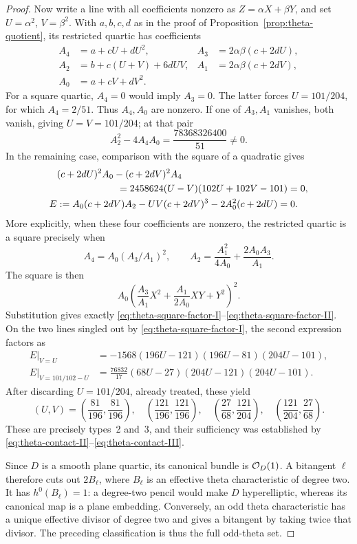 \begin{proof}
Now write a line with all coefficients nonzero as $Z=\alpha X+\beta Y$,
and set $U=\alpha^2$, $V=\beta^2$.  With $a,b,c,d$ as in the proof of
Proposition~\ref{prop:theta-quotient}, its restricted quartic has
coefficients
\begin{align*}
 A_4&=a+cU+dU^2,&
 A_3&=2\alpha\beta(c+2dU),\\
 A_2&=b+c(U+V)+6dUV,&
 A_1&=2\alpha\beta(c+2dV),\\
 A_0&=a+cV+dV^2.
\end{align*}
For a square quartic, $A_4=0$ would imply $A_3=0$.  The latter forces
$U=101/204$, for which $A_4=2/51$.  Thus $A_4,A_0$ are nonzero.
If one of $A_3,A_1$ vanishes, both vanish, giving $U=V=101/204$; at that
pair
\[
 A_2^2-4A_4A_0=\frac{78368326400}{51}\ne0.
\]
In the remaining case, comparison with the square of a quadratic gives
\begin{align}
 &(c+2dU)^2A_0-(c+2dV)^2A_4\notag\\
 &\hspace{22mm}=2458624(U-V)(102U+102V-101)=0,
 \label{eq:theta-square-factor-I}\\
 E&:=A_0(c+2dV)A_2-UV(c+2dV)^3-2A_0^2(c+2dU)=0.
 \label{eq:theta-square-factor-II}
\end{align}
More explicitly, when these four coefficients are nonzero, the restricted
quartic is a square precisely when
\[
 A_4=A_0(A_3/A_1)^2,\qquad
 A_2=\frac{A_1^2}{4A_0}+\frac{2A_0A_3}{A_1}.
\]
The square is then
\[
 A_0\left(\frac{A_3}{A_1}X^2+
                   \frac{A_1}{2A_0}XY+Y^2\right)^2.
\]
Substitution gives exactly
\eqref{eq:theta-square-factor-I}--\eqref{eq:theta-square-factor-II}.
On the two lines singled out by
\eqref{eq:theta-square-factor-I}, the second expression factors as
\begin{align*}
 E|_{V=U}
  &=-1568(196U-121)(196U-81)(204U-101),\\
 E|_{V=101/102-U}
  &=\frac{76832}{17}(68U-27)(204U-121)(204U-101).
\end{align*}
After discarding $U=101/204$, already treated, these yield
\[
 (U,V)=\left(\frac{81}{196},\frac{81}{196}\right),\quad
       \left(\frac{121}{196},\frac{121}{196}\right),\quad
       \left(\frac{27}{68},\frac{121}{204}\right),\quad
       \left(\frac{121}{204},\frac{27}{68}\right).
\]
These are precisely types~2 and~3, and their sufficiency was established
by \eqref{eq:theta-contact-II}--\eqref{eq:theta-contact-III}.

Since $D$ is a smooth plane quartic, its canonical bundle is
$\mathcal O_D(1)$.  A bitangent $\ell$ therefore cuts out $2B_\ell$, where
$B_\ell$ is an effective theta characteristic of degree two.
It has $h^0(B_\ell)=1$: a degree-two pencil would make $D$
hyperelliptic, whereas its canonical map is a plane embedding.
Conversely, an odd theta characteristic has a unique effective divisor
of degree two and gives a bitangent by taking twice that divisor.
The preceding classification is thus the full odd-theta set.


\end{proof}
